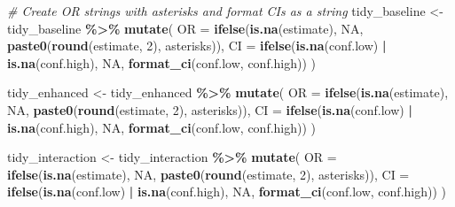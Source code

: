 \documentclass[
]{article}
\newenvironment{Shaded}{\begin{snugshade}}{\end{snugshade}}
\newcommand{\AttributeTok}[1]{\textcolor[rgb]{0.13,0.29,0.53}{#1}}
\newcommand{\CommentTok}[1]{\textcolor[rgb]{0.56,0.35,0.01}{\textit{#1}}}
\newcommand{\ConstantTok}[1]{\textcolor[rgb]{0.56,0.35,0.01}{#1}}
\newcommand{\DecValTok}[1]{\textcolor[rgb]{0.00,0.00,0.81}{#1}}
\newcommand{\FunctionTok}[1]{\textcolor[rgb]{0.13,0.29,0.53}{\textbf{#1}}}
\newcommand{\NormalTok}[1]{#1}
\newcommand{\OtherTok}[1]{\textcolor[rgb]{0.56,0.35,0.01}{#1}}
\newcommand{\SpecialCharTok}[1]{\textcolor[rgb]{0.81,0.36,0.00}{\textbf{#1}}}
\begin{document}
\begin{Shaded}
\end{Shaded}

\begin{Shaded}
\begin{Highlighting}[]
\CommentTok{\# Create OR strings with asterisks and format CIs as a string}
\NormalTok{tidy\_baseline }\OtherTok{\textless{}{-}}\NormalTok{ tidy\_baseline }\SpecialCharTok{\%\textgreater{}\%}
  \FunctionTok{mutate}\NormalTok{(}
    \AttributeTok{OR =} \FunctionTok{ifelse}\NormalTok{(}\FunctionTok{is.na}\NormalTok{(estimate), }\ConstantTok{NA}\NormalTok{, }\FunctionTok{paste0}\NormalTok{(}\FunctionTok{round}\NormalTok{(estimate, }\DecValTok{2}\NormalTok{), asterisks)),}
    \AttributeTok{CI =} \FunctionTok{ifelse}\NormalTok{(}\FunctionTok{is.na}\NormalTok{(conf.low) }\SpecialCharTok{|} \FunctionTok{is.na}\NormalTok{(conf.high), }\ConstantTok{NA}\NormalTok{, }\FunctionTok{format\_ci}\NormalTok{(conf.low, conf.high))}
\NormalTok{  )}

\NormalTok{tidy\_enhanced }\OtherTok{\textless{}{-}}\NormalTok{ tidy\_enhanced }\SpecialCharTok{\%\textgreater{}\%}
  \FunctionTok{mutate}\NormalTok{(}
    \AttributeTok{OR =} \FunctionTok{ifelse}\NormalTok{(}\FunctionTok{is.na}\NormalTok{(estimate), }\ConstantTok{NA}\NormalTok{, }\FunctionTok{paste0}\NormalTok{(}\FunctionTok{round}\NormalTok{(estimate, }\DecValTok{2}\NormalTok{), asterisks)),}
    \AttributeTok{CI =} \FunctionTok{ifelse}\NormalTok{(}\FunctionTok{is.na}\NormalTok{(conf.low) }\SpecialCharTok{|} \FunctionTok{is.na}\NormalTok{(conf.high), }\ConstantTok{NA}\NormalTok{, }\FunctionTok{format\_ci}\NormalTok{(conf.low, conf.high))}
\NormalTok{  )}

\NormalTok{tidy\_interaction }\OtherTok{\textless{}{-}}\NormalTok{ tidy\_interaction }\SpecialCharTok{\%\textgreater{}\%}
  \FunctionTok{mutate}\NormalTok{(}
    \AttributeTok{OR =} \FunctionTok{ifelse}\NormalTok{(}\FunctionTok{is.na}\NormalTok{(estimate), }\ConstantTok{NA}\NormalTok{, }\FunctionTok{paste0}\NormalTok{(}\FunctionTok{round}\NormalTok{(estimate, }\DecValTok{2}\NormalTok{), asterisks)),}
    \AttributeTok{CI =} \FunctionTok{ifelse}\NormalTok{(}\FunctionTok{is.na}\NormalTok{(conf.low) }\SpecialCharTok{|} \FunctionTok{is.na}\NormalTok{(conf.high), }\ConstantTok{NA}\NormalTok{, }\FunctionTok{format\_ci}\NormalTok{(conf.low, conf.high))}
\NormalTok{  )}
\end{Highlighting}
\end{Shaded}
\end{document}
